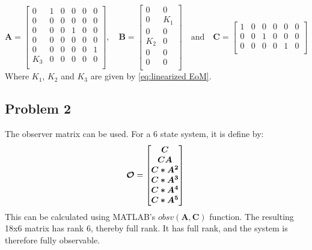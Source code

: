 \begin{equation}
  \label{eq:state_space_A_B_C}
  \bm{A} =
  \begin{bmatrix}
    0 & 1 & 0 & 0 & 0 & 0 \\
    0 & 0 & 0 & 0 & 0 & 0 \\
    0 & 0 & 0 & 1 & 0 & 0 \\
    0 & 0 & 0 & 0 & 0 & 0 \\
    0 & 0 & 0 & 0 & 0 & 1 \\
    K_3 & 0 & 0 & 0 & 0 & 0 \\
  \end{bmatrix}
  , \quad \bm{B} =
  \begin{bmatrix}
    0 & 0 \\
    0 & K_1 \\
    0 & 0 \\
    K_2 & 0 \\
    0 & 0 \\
    0 & 0 \\
  \end{bmatrix}
  \quad \text{and} \quad \bm{C} =
  \begin{bmatrix}
    1 & 0 & 0 & 0 & 0 & 0 \\
    0 & 0 & 1 & 0 & 0 & 0 \\
    0 & 0 & 0 & 0 & 1 & 0 \\
  \end{bmatrix}
\end{equation}
%
Where $K_1$, $K_2$ and $K_3$ are given by \cref{eq:linearized EoM}.
%
\subsection{Problem 2}
The observer matrix can be used. For a 6 state system, it is define by:
\begin{equation}
	\bm{\mathcal{O}} = 
	\begin{bmatrix}
		\bm{C} \\
		\bm{CA} \\
		\bm{C*A^2} \\
		\bm{C*A^3} \\
		\bm{C*A^4} \\
		\bm{C*A^5} \\
	\end{bmatrix} \\
\end{equation}
This can be calculated using MATLAB's $obsv(\bm{A},\bm{C})$ function. The resulting 18x6 matrix has rank 6, thereby full rank.
%
It has full rank, and the system is therefore fully observable.

